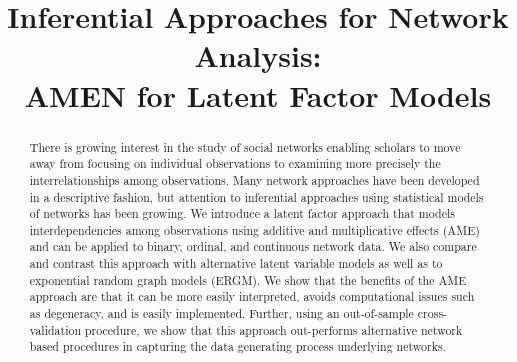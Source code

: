 \documentclass[12pt,pdflatex]{elsarticle}
\begin{document}
\thispagestyle{empty}
\begin{frontmatter}

\title{Inferential Approaches for Network Analysis: \\ AMEN for Latent Factor Models}




\begin{abstract}
	There is growing interest in the study of social networks enabling scholars to move away from focusing on individual observations to examining more precisely the interrelationships among observations. Many network approaches have been developed in a descriptive fashion, but attention to inferential approaches using statistical models of networks has been growing. We introduce a latent factor approach that models interdependencies among observations using additive and multiplicative effects (AME) and can be applied to binary, ordinal, and continuous network data. We also compare and contrast this approach with alternative latent variable models as well as to exponential random graph models (ERGM). We show that the benefits of the AME approach are that it can be more easily interpreted, avoids computational issues such as degeneracy, and is easily implemented. Further, using an out-of-sample cross-validation procedure, we show that this approach out-performs alternative network based procedures in capturing the data generating process underlying networks. 
\end{abstract}
\end{frontmatter}


\newpage\setcounter{page}{1} 
\end{document}
